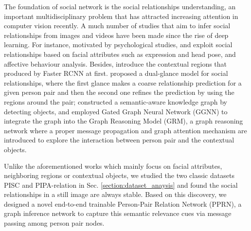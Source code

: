 \documentclass{article}
\newcommand{\PPRN}{{\sf PPRN}}
\begin{document}
The foundation of social network is the social relationships understanding, an important multidisciplinary problem that has attracted increasing attention in computer vision recently. A much number of studies that aim to infer social relationships from images \cite{DBLP:conf/iccv/LiWZK17,DBLP:conf/ijcai/WangCRYCL18,DBLP:conf/eccv/WangGLF10,DBLP:conf/iccv/ZhangLLT15} and videos \cite{DBLP:conf/eccv/DingY10,DBLP:conf/cvpr/RamanathanY013,DBLP:journals/ivc/VinciarelliPB09} have been made since the rise of deep learning. For instance, motivated by psychological studies, \cite{DBLP:conf/iccv/ZhangLLT15} and \cite{DBLP:conf/iccv/DibekliogluSG13} exploit social relationships based on facial attributes such as expression and head pose, and affective behaviour analysis. 
Besides, \cite{DBLP:conf/iccv/LiWZK17} introduce the contextual regions that produced by Faster RCNN\cite{DBLP:conf/nips/RenHGS15} at first.
\cite{DBLP:conf/iccv/LiWZK17} proposed a dual-glance model for social relationships, where the first glance makes a coarse relationship prediction for a given person pair and then the second one refines the prediction by using the regions around the pair; \cite{DBLP:conf/ijcai/WangCRYCL18} constructed a semantic-aware knowledge graph by detecting objects, and employed Gated Graph Neural Network (GGNN) \cite{DBLP:journals/tomccap/LiSKJZW15} to integrate the graph into the Graph Reasoning Model (GRM), a graph reasoning network where a proper message propagation and graph attention mechanism are introduced to explore the interaction between person pair and the contextual objects.

Unlike the aforementioned works which mainly focus on facial attributes, neighboring regions or contextual objects, we studied the two classic datasets PISC \cite{DBLP:conf/iccv/LiWZK17} and PIPA-relation \cite{DBLP:conf/cvpr/SunSF17} in Sec. \ref{section:dataset_anaysis} and found the social relationships in a still image are always stable. Based on this discovery, we designed a novel end-to-end trainable Person-Pair Relation Network (\PPRN), a graph inference network to capture this semantic relevance cues via message passing among person pair nodes.
\end{document}
